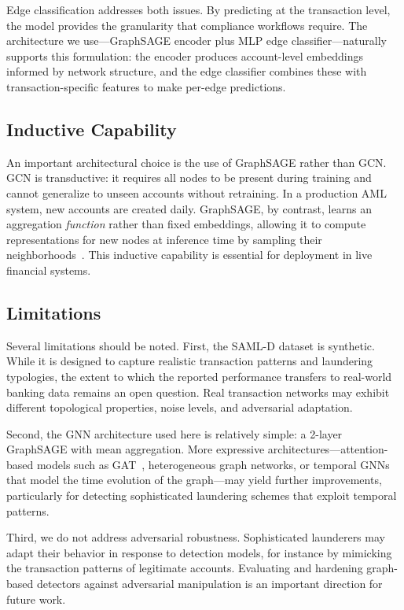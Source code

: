 \documentclass[conference]{IEEEtran}
\begin{document}
Edge classification addresses both issues. By predicting at the transaction level, the model provides the granularity that compliance workflows require. The architecture we use---GraphSAGE encoder plus MLP edge classifier---naturally supports this formulation: the encoder produces account-level embeddings informed by network structure, and the edge classifier combines these with transaction-specific features to make per-edge predictions.

\subsection{Inductive Capability}

An important architectural choice is the use of GraphSAGE rather than GCN. GCN is transductive: it requires all nodes to be present during training and cannot generalize to unseen accounts without retraining. In a production AML system, new accounts are created daily. GraphSAGE, by contrast, learns an aggregation \textit{function} rather than fixed embeddings, allowing it to compute representations for new nodes at inference time by sampling their neighborhoods~\cite{hamilton2017graphsage}. This inductive capability is essential for deployment in live financial systems.

\subsection{Limitations}

Several limitations should be noted. First, the SAML-D dataset is synthetic. While it is designed to capture realistic transaction patterns and laundering typologies, the extent to which the reported performance transfers to real-world banking data remains an open question. Real transaction networks may exhibit different topological properties, noise levels, and adversarial adaptation.

Second, the GNN architecture used here is relatively simple: a 2-layer GraphSAGE with mean aggregation. More expressive architectures---attention-based models such as GAT~\cite{velickovic2018gat}, heterogeneous graph networks, or temporal GNNs that model the time evolution of the graph---may yield further improvements, particularly for detecting sophisticated laundering schemes that exploit temporal patterns.

Third, we do not address adversarial robustness. Sophisticated launderers may adapt their behavior in response to detection models, for instance by mimicking the transaction patterns of legitimate accounts. Evaluating and hardening graph-based detectors against adversarial manipulation is an important direction for future work.
\end{document}
